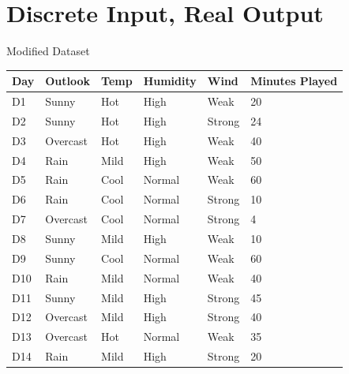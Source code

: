 \documentclass[usenames,dvipsnames]{beamer}
\begin{document}
\section{Discrete Input, Real Output}

\begin{frame}{Modified Dataset}
\begin{table}[]
	\begin{tabular}{@{}llllll@{}}
		\toprule
		\textbf{Day} & \textbf{Outlook} & \textbf{Temp} & \textbf{Humidity} & \textbf{Wind} & \textbf{Minutes Played} \\ \midrule
		D1           & Sunny            & Hot           & High              & Weak          & 20                      \\
		D2           & Sunny            & Hot           & High              & Strong        & 24                      \\
		D3           & Overcast         & Hot           & High              & Weak          & 40                      \\
		D4           & Rain             & Mild          & High              & Weak          & 50                      \\
		D5           & Rain             & Cool          & Normal            & Weak          & 60                      \\
		D6           & Rain             & Cool          & Normal            & Strong        & 10                      \\
		D7           & Overcast         & Cool          & Normal            & Strong        & 4                       \\
		D8           & Sunny            & Mild          & High              & Weak          & 10                      \\
		D9           & Sunny            & Cool          & Normal            & Weak          & 60                      \\
		D10          & Rain             & Mild          & Normal            & Weak          & 40                      \\
		D11          & Sunny            & Mild          & High              & Strong        & 45                      \\
		D12          & Overcast         & Mild          & High              & Strong        & 40                      \\
		D13          & Overcast         & Hot           & Normal            & Weak          & 35                      \\
		D14          & Rain             & Mild          & High              & Strong        & 20                      \\ \bottomrule
	\end{tabular}
\end{table}
\end{frame}
\end{document}
